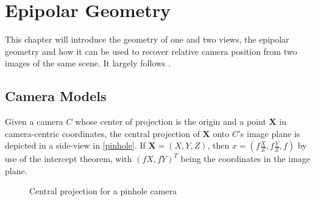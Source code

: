 \chapter{Epipolar Geometry}

This chapter will introduce the geometry of one and two views, the epipolar geometry and
how it can be used to recover relative camera position from two images of the
same scene. It largely follows \citep[chapters 6,7]{h&z2004}.

\section{Camera Models}

Given a camera $C$ whose center of projection is the origin and a point $\mathbf{X}$
in camera-centric coordinates, the central projection of $\mathbf{X}$ onto $C$'s
image plane is depicted in a side-view in \autoref{pinhole}. If $\mathbf{X} = (X,Y,Z)$, then
$x=\left(f \frac{X}{Z}, f \frac{Y}{Z}, f\right)$ by use of the intercept
theorem, with $\left(fX, fY\right)^T$ being the coordinates in the image plane.

\begin{figure}[h]
   {\centering      
      
      \caption{Central projection for a pinhole camera}
   \label{pinhole}}
\end{figure}


